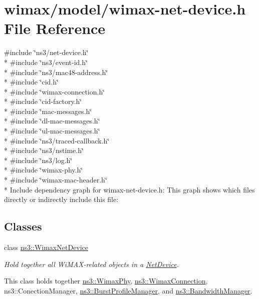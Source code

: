 \hypertarget{wimax-net-device_8h}{}\section{wimax/model/wimax-\/net-\/device.h File Reference}
\label{wimax-net-device_8h}
{\ttfamily \#include \char`\"{}ns3/net-\/device.\+h\char`\"{}}\\*
{\ttfamily \#include \char`\"{}ns3/event-\/id.\+h\char`\"{}}\\*
{\ttfamily \#include \char`\"{}ns3/mac48-\/address.\+h\char`\"{}}\\*
{\ttfamily \#include \char`\"{}cid.\+h\char`\"{}}\\*
{\ttfamily \#include \char`\"{}wimax-\/connection.\+h\char`\"{}}\\*
{\ttfamily \#include \char`\"{}cid-\/factory.\+h\char`\"{}}\\*
{\ttfamily \#include \char`\"{}mac-\/messages.\+h\char`\"{}}\\*
{\ttfamily \#include \char`\"{}dl-\/mac-\/messages.\+h\char`\"{}}\\*
{\ttfamily \#include \char`\"{}ul-\/mac-\/messages.\+h\char`\"{}}\\*
{\ttfamily \#include \char`\"{}ns3/traced-\/callback.\+h\char`\"{}}\\*
{\ttfamily \#include \char`\"{}ns3/nstime.\+h\char`\"{}}\\*
{\ttfamily \#include \char`\"{}ns3/log.\+h\char`\"{}}\\*
{\ttfamily \#include \char`\"{}wimax-\/phy.\+h\char`\"{}}\\*
{\ttfamily \#include \char`\"{}wimax-\/mac-\/header.\+h\char`\"{}}\\*
Include dependency graph for wimax-\/net-\/device.h\+:
This graph shows which files directly or indirectly include this file\+:
\subsection*{Classes}
\begin{DoxyCompactItemize}
\item 
class \hyperlink{classns3_1_1WimaxNetDevice}{ns3\+::\+Wimax\+Net\+Device}
\begin{DoxyCompactList}\small\item\em Hold together all Wi\+M\+A\+X-\/related objects in a \hyperlink{classns3_1_1NetDevice}{Net\+Device}.

This class holds together \hyperlink{classns3_1_1WimaxPhy}{ns3\+::\+Wimax\+Phy}, \hyperlink{classns3_1_1WimaxConnection}{ns3\+::\+Wimax\+Connection}, ns3\+::\+Conection\+Manager, \hyperlink{classns3_1_1BurstProfileManager}{ns3\+::\+Burst\+Profile\+Manager}, and \hyperlink{classns3_1_1BandwidthManager}{ns3\+::\+Bandwidth\+Manager}. \end{DoxyCompactList}\end{DoxyCompactItemize}
